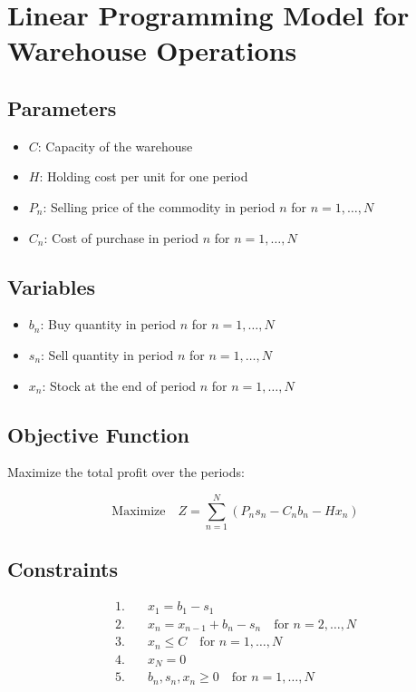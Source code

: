 \documentclass{article}
\begin{document}
\section*{Linear Programming Model for Warehouse Operations}

\subsection*{Parameters}
\begin{itemize}
    \item $C$: Capacity of the warehouse
    \item $H$: Holding cost per unit for one period
    \item $P_n$: Selling price of the commodity in period $n$ for $n = 1, \ldots, N$
    \item $C_n$: Cost of purchase in period $n$ for $n = 1, \ldots, N$
\end{itemize}

\subsection*{Variables}
\begin{itemize}
    \item $b_n$: Buy quantity in period $n$ for $n = 1, \ldots, N$
    \item $s_n$: Sell quantity in period $n$ for $n = 1, \ldots, N$
    \item $x_n$: Stock at the end of period $n$ for $n = 1, \ldots, N$
\end{itemize}

\subsection*{Objective Function}
Maximize the total profit over the periods:

\[
\text{Maximize} \quad Z = \sum_{n=1}^{N} \left( P_n s_n - C_n b_n - H x_n \right)
\]

\subsection*{Constraints}
\begin{align*}
1. & \quad x_1 = b_1 - s_1 \\
2. & \quad x_n = x_{n-1} + b_n - s_n \quad \text{for } n = 2, \ldots, N \\
3. & \quad x_n \leq C \quad \text{for } n = 1, \ldots, N \\
4. & \quad x_N = 0 \\
5. & \quad b_n, s_n, x_n \geq 0 \quad \text{for } n = 1, \ldots, N
\end{align*}
\end{document}
